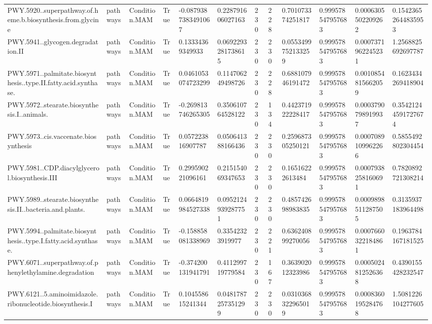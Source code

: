 \begin{longtable}{llllllllllll}
PWY.5920..superpathway.of.heme.b.biosynthesis.from.glycine & pathways & Condition.MAM & True & -0.0879387383491067 & 0.228791606027163 & 230 & 228 & 0.701073374251817 & 0.999578547957683 & 0.0006305502209262 & 0.15423652644835953 \\
PWY.5941..glycogen.degradation.II & pathways & Condition.MAM & True & 0.13334369349933 & 0.0692293281738615 & 230 & 230 & 0.0553499752133259 & 0.999578547957683 & 0.0007371962245231 & 1.2568825692697787 \\
PWY.5971..palmitate.biosynthesis..type.II.fatty.acid.synthase. & pathways & Condition.MAM & True & 0.0461053074723299 & 0.114706249498726 & 230 & 228 & 0.688107946191472 & 0.999578547957683 & 0.0010854815662059 & 0.1623434269418904 \\
PWY.5972..stearate.biosynthesis.I..animals. & pathways & Condition.MAM & True & -0.269813746265305 & 0.350610764528122 & 230 & 134 & 0.442371922228417 & 0.999578547957683 & 0.0003790798919937 & 0.35421244591727674 \\
PWY.5973..cis.vaccenate.biosynthesis & pathways & Condition.MAM & True & 0.057223816907787 & 0.050641388166436 & 230 & 230 & 0.259687305250121 & 0.999578547957683 & 0.0007089109962266 & 0.5855492802304454 \\
PWY.5981..CDP.diacylglycerol.biosynthesis.III & pathways & Condition.MAM & True & 0.299590221096161 & 0.215154069347653 & 230 & 230 & 0.16516222613484 & 0.999578547957683 & 0.0007938258160691 & 0.7820892721308214 \\
PWY.5989..stearate.biosynthesis.II..bacteria.and.plants. & pathways & Condition.MAM & True & 0.0664819984527338 & 0.0952124939287751 & 230 & 230 & 0.485742698983835 & 0.999578547957683 & 0.0009898511287505 & 0.3135937183964498 \\
PWY.5994..palmitate.biosynthesis..type.I.fatty.acid.synthase. & pathways & Condition.MAM & True & -0.158858081338969 & 0.33542323919977 & 230 & 221 & 0.636240899270056 & 0.999578547957683 & 0.0007660322184861 & 0.1963784167181525 \\
PWY.6071..superpathway.of.phenylethylamine.degradation & pathways & Condition.MAM & True & -0.374200131941791 & 0.411299719779584 & 230 & 167 & 0.363902012323986 & 0.999578547957683 & 0.0005024812526368 & 0.4390155428232547 \\
PWY.6121..5.aminoimidazole.ribonucleotide.biosynthesis.I & pathways & Condition.MAM & True & 0.104558615241344 & 0.0481787257351299 & 230 & 230 & 0.0310368322965019 & 0.999578547957683 & 0.0008360195284768 & 1.5081226104277605 \\

\end{longtable}
